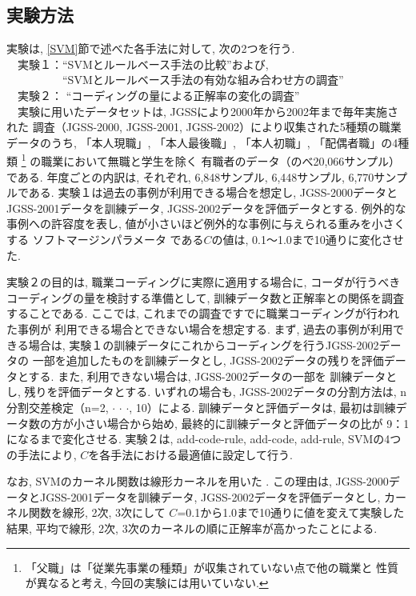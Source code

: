 \documentclass{nlp}
\begin{document}
\subsection{実験方法}
実験は, \ref{SVM}節で述べた各手法に対して, 次の2つを行う. 
\vspace{2mm}\\
　実験１：``SVMとルールベース手法の比較''および,\\ 
　　　　　``SVMとルールベース手法の有効な組み合わせ方の調査''\\
　実験２： ``コーディングの量による正解率の変化の調査''
\vspace{2mm}\\ 
　実験に用いたデータセットは, JGSSにより2000年から2002年まで毎年実施された
調査（JGSS-2000, JGSS-2001, JGSS-2002）により収集された5種類の職業データのうち, 
「本人現職」, 「本人最後職」, 「本人初職」, 「配偶者職」の4種類
\footnote{「父職」は「従業先事業の種類」が収集されていない点で他の職業と
性質が異なると考え, 今回の実験には用いていない. }
の職業において無職と学生を除く
有職者のデータ（のべ20,066サンプル）である. 
年度ごとの内訳は, 
それぞれ, 6,848サンプル, 6,448サンプル, 6,770サンプルである. 
実験１は過去の事例が利用できる場合を想定し, 
JGSS-2000データとJGSS-2001データを訓練データ, 
JGSS-2002データを評価データとする. 
例外的な事例への許容度を表し, 
値が小さいほど例外的な事例に与えられる重みを小さくする
ソフトマージンパラメータ
である$C$の値は, 
0.1〜1.0まで10通りに変化させた. 

実験２の目的は, 職業コーディングに実際に適用する場合に, 
コーダが行うべきコーディングの量を検討する準備として, 
訓練データ数と正解率との関係を調査することである. 
ここでは, これまでの調査ですでに職業コーディングが行われた事例が
利用できる場合とできない場合を想定する. 
まず, 過去の事例が利用できる場合は, 
実験１の訓練データにこれからコーディングを行うJGSS-2002データの
一部を追加したものを訓練データとし, 
JGSS-2002データの残りを評価データとする. 
また, 利用できない場合は, 
JGSS-2002データの一部を
訓練データとし, 残りを評価データとする. 
いずれの場合も, 
JGSS-2002データの分割方法は, 
n分割交差検定（n=2, $\cdot$  $\cdot$  $\cdot$, 10）による. 
訓練データと評価データは, 
最初は訓練データ数の方が小さい場合から始め, 
最終的に訓練データと評価データの比が
9：1になるまで変化させる. 
実験２は, add-code-rule, add-code, add-rule, SVMの4つの手法により,
$C$を各手法における最適値に設定して行う. 

なお, SVMのカーネル関数は線形カーネルを用いた
. 
この理由は, JGSS-2000データとJGSS-2001データを訓練データ, 
JGSS-2002データを評価データとし, 
カーネル関数を線形, 2次, 3次にして 
$C$=0.1から1.0まで10通りに値を変えて実験した結果, 
平均で線形, 2次, 3次のカーネルの順に正解率が高かったことによる. 
\end{document}
